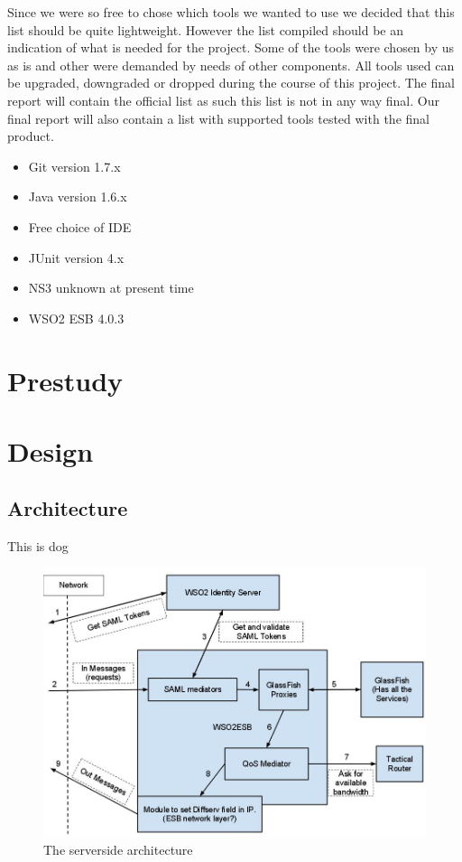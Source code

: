 \documentclass[12pt]{article}
\begin{document}
    Since we were so free to chose which tools we wanted to use we decided that this list should be quite lightweight. However the list compiled should be an indication of what is needed for the project. Some of the tools were chosen by us as is and other were demanded by needs of other components. All tools used can be  upgraded, downgraded or dropped during the course of this project. The final report will contain the official list as such this list is not in any way final. Our final report will also contain a list with supported tools tested with the final product.
    \begin{itemize}
        \item Git version 1.7.x
        \item Java version 1.6.x
        \item Free choice of IDE
        \item JUnit version 4.x
        \item NS3 unknown at present time
        \item WSO2 ESB 4.0.3
    \end{itemize}
\section{Prestudy}\label{prestudy}
\section{Design}\label{design}
    \subsection{Architecture}\label{architecture}
    This is dog
        \begin{figure}
            \includegraphics[scale=0.5]{serverside}
            \caption{The serverside architecture}
            \label{fig:serverside}
        \end{figure}
        
\end{document}
